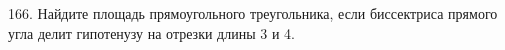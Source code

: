 166. Найдите площадь прямоугольного треугольника, если биссектриса прямого угла делит гипотенузу на отрезки длины 3 и 4.\\
